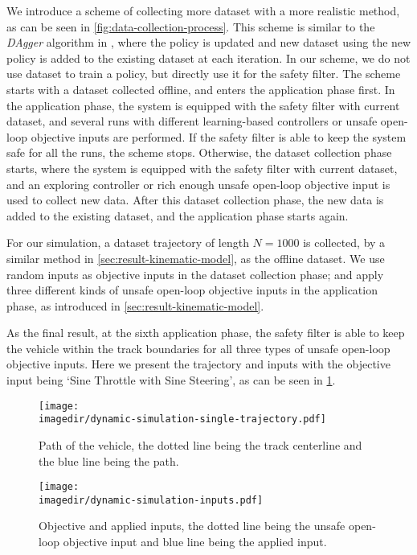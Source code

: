 We introduce a scheme of collecting more dataset with a more realistic method, as can be seen in \cref{fig:data-collection-process}.
This scheme is similar to the \emph{DAgger} algorithm in \cite{rossReductionImitationLearning2011}, where the policy is updated and new dataset using the new policy is added to the existing dataset at each iteration.
In our scheme, we do not use dataset to train a policy, but directly use it for the safety filter.
The scheme starts with a dataset collected offline, and enters the application phase first.
In the application phase, the system is equipped with the safety filter with current dataset, and several runs with different learning-based controllers or unsafe open-loop objective inputs are performed.
If the safety filter is able to keep the system safe for all the runs, the scheme stops.
Otherwise, the dataset collection phase starts, where the system is equipped with the safety filter with current dataset, and an exploring controller or rich enough unsafe open-loop objective input is used to collect new data.
After this dataset collection phase, the new data is added to the existing dataset, and the application phase starts again.


For our simulation, a dataset trajectory of length $N=1000$ is collected, by a similar method in \cref{sec:result-kinematic-model}, as the offline dataset.
We use random inputs as objective inputs in the dataset collection phase; and apply three different kinds of unsafe open-loop objective inputs in the application phase, as introduced in \cref{sec:result-kinematic-model}.

As the final result, at the sixth application phase, the safety filter is able to keep the vehicle within the track boundaries for all three types of unsafe open-loop objective inputs.
Here we present the trajectory and inputs with the objective input being `Sine Throttle with Sine Steering', as can be seen in \cref{fig:dynamic-single-run}.

\begin{figure}[ht]
    \centering
    \texttt{[image: \\imagedir/dynamic-simulation-single-trajectory.pdf]}
    \caption{Path of the vehicle, the dotted line being the track centerline and the blue line being the path.}
    \texttt{[image: \\imagedir/dynamic-simulation-inputs.pdf]}
    \caption{Objective and applied inputs, the dotted line being the unsafe open-loop objective input and blue line being the applied input.}
    \label{fig:dynamic-single-run}
\end{figure}

